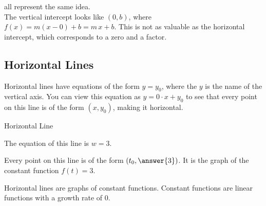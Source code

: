 \documentclass{ximera}
\begin{document}
all represent the same idea. \\



The vertical intercept looks like $(0, b)$, where $f(x) = m(x-0)+b = m \, x + b$.  This is not as valuable as the horizontal intercept, which corresponds to a zero and a factor. \\










\subsection{Horizontal Lines} 

Horizontal lines have equations of the form $y = y_0$, where the $y$ is the name of the vertical axis. You can view this equation as $y = 0 \cdot x + y_0$ to see that every point on this line is of the form $(x, y_0)$, making it horizontal.





\begin{example} Horizontal Line





The equation of this line is $w=3$.  

\begin{image}
\end{image}

Every point on this line is of the form $\left(t_0, \answer{3}\right)$. It is the graph of the constant function $f(t)=3$.


\end{example}
Horizontal lines are graphs of constant functions.  Constant functions are linear functions with a growth rate of $0$. \\
\end{document}
